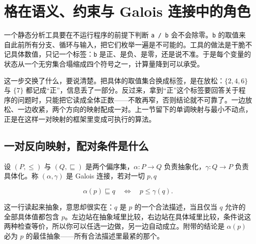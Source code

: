 \section{格在语义、约束与 Galois 连接中的角色}
\label{sec:04-Discrete-Mathematics/08-Rings-and-Lattices/03}

一个静态分析工具要在不运行程序的前提下判断 \texttt{a / b} 会不会除零。\texttt{b} 的取值来自此前所有分支、循环与输入，把它们枚举一遍是不可能的。工具的做法是干脆不记具体数值，只记一个标签：\texttt{b} 是正、是负、是零，还是说不准。于是每个变量的状态从一个无穷集合塌缩成四个符号之一，计算量降到可以承受。

这一步交换了什么，要说清楚。把具体的取值集合换成标签，是在放松：\(\{2,4,6\}\) 与 \(\{7\}\) 都记成``正''，信息丢了一部分。反过来，拿到``正''这个标签要回答关于程序的问题时，只能把它读成全体正数——不敢再窄，否则结论就不可靠了。一边放松、一边收紧，两个方向的映射配成一对。上一节留下的单调映射与最小不动点，正是在这样一对映射的框架里变成可执行的算法。

\subsection{一对反向映射，配对条件是什么}

设 \((P,\le)\) 与 \((Q,\sqsubseteq)\) 是两个偏序集，\(\alpha:P\to Q\) 负责抽象化，\(\gamma:Q\to P\) 负责具体化。称 \((\alpha,\gamma)\) 是 Galois 连接，若对一切 \(p,q\)

\[
\alpha(p)\sqsubseteq q
\quad\Longleftrightarrow\quad
p\le\gamma(q).
\]

这一行读起来抽象，意思却很实在：\(q\) 是 \(p\) 的一个合法描述，当且仅当 \(q\) 允许的全部具体值都包含 \(p\)。左边站在抽象域里比较，右边站在具体域里比较，条件说这两种检查等价，所以你可以任选一边做，另一边自动成立。附带的结论是 \(\alpha(p)\) 必为 \(p\) 的最佳抽象——所有合法描述里最紧的那个。

